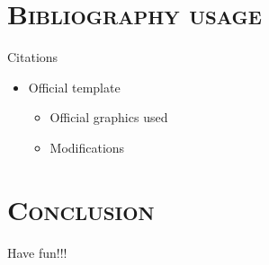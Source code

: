 \documentclass[xcolor=x11names,compress,aspectratio=169]{beamer}
\begin{document}
\section{\scshape Bibliography usage}
\begin{frame}{Citations}
  \begin{itemize}
  \setlength\itemsep{0.5em}
      \item Official template
      \vspace{0.5em}
      \begin{itemize}
          \item Official graphics used\footnotemark
          \item Modifications\footnotemark
      \end{itemize}
  \end{itemize}
\end{frame}
\section{\scshape Conclusion}
\begin{frame}[c]{}
    \centering \Large
    \textcolor{GopherDarkMaroon}{Have fun!!!}
\end{frame}
\begingroup
{
\begin{frame}[plain]{}
\end{frame}
}
\endgroup
\end{document}
